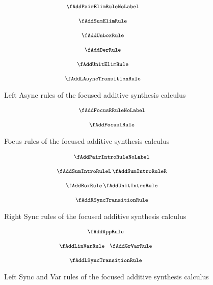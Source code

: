 \begin{figure}[H]
  \begin{align*}
    {\footnotesize{
\hspace{-3em}\begin{array}{c}
  \fAddPairElimRuleNoLabel
  \\[1.25em]
  \fAddSumElimRule
  \\[1.25em]
  \fAddUnboxRule
  \\[1.25em]
  \fAddDerRule
  \\[1.25em]
  \fAddUnitElimRule
  \\[1.25em]
  \fAddLAsyncTransitionRule
  \end{array}
    }}
  \end{align*}
  \caption{Left Async rules of the focused additive synthesis calculus}
  \label{fig:focus-add-left-async}
\end{figure}

\begin{figure}[H]
  \begin{align*}
    {\footnotesize{
\begin{array}{c}
  \fAddFocusRRuleNoLabel
  \\[1.25em]
  \fAddFocusLRule
  \end{array}
    }}
  \end{align*}
  \caption{Focus rules of the focused additive synthesis calculus}
  \label{fig:focus-add-focus}
\end{figure}

\begin{figure}[H]
  \begin{align*}
    {\footnotesize{
\begin{array}{c}
  \fAddPairIntroRuleNoLabel
  \\[1.25em]
  \fAddSumIntroRuleL
  \,
  \fAddSumIntroRuleR
  \\[1.25em]
  \fAddBoxRule
  \,
  \fAddUnitIntroRule
  \\[1.25em]
  \fAddRSyncTransitionRule
  \end{array}
    }}
  \end{align*}
  \caption{Right Sync rules of the focused additive synthesis calculus}
  \label{fig:focus-add-right-sync}
\end{figure}

\begin{figure}[H]
  \begin{align*}
    {\footnotesize{
\hspace{-2em}\begin{array}{c}
  \fAddAppRule
  \\[1.25em]
  \fAddLinVarRule
  \;\;\;
  \fAddGrVarRule
  \\[1.25em]
  \fAddLSyncTransitionRule
  \end{array}
    }}
  \end{align*}
  \caption{Left Sync and Var rules of the focused additive synthesis calculus}
  \label{fig:focus-add-left-sync}
\end{figure}

